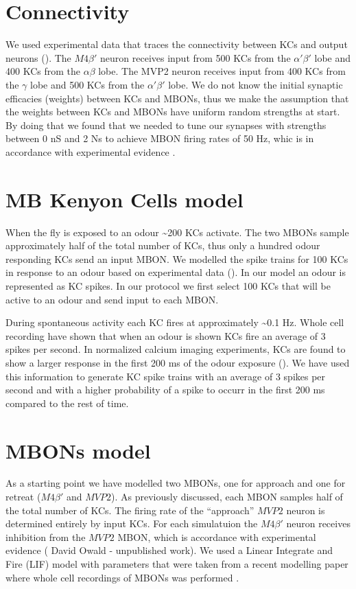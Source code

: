 \section{Connectivity}

We used experimental data that traces the connectivity between KCs
and output neurons (\citealp{Aso:2014bh}). The $M4\beta'$ neuron
receives input from 500 KCs from the $\alpha'\beta'$ lobe and 400
KCs from the $\alpha\beta$ lobe. The MVP2 neuron receives input from
400 KCs from the $\gamma$ lobe and 500 KCs from the $\alpha'\beta'$
lobe. We do not know the initial synaptic efficacies (weights) between
KCs and MBONs, thus we make the assumption that the weights between
KCs and MBONs have uniform random strengths at start. By doing that
we found that we needed to tune our synapses with strengths between
0 nS and 2 Ns to achieve MBON firing rates of 50 Hz, whic is in accordance
with experimental evidence \citep{Hige:2015er}.

\section{MB Kenyon Cells model}

When the fly is exposed to an odour \textasciitilde{}200 KCs activate.
The two MBONs sample approximately half of the total number of KCs,
thus only a hundred odour responding KCs send an input MBON. We modelled
the spike trains for 100 KCs in response to an odour based on experimental
data (\citealp{Turner:2008eo}). In our model an odour is represented
as KC spikes. In our protocol we first select 100 KCs that will be
active to an odour and send input to each MBON. 

During spontaneous activity each KC fires at approximately \textasciitilde{}0.1
Hz. Whole cell recording have shown that when an odour is shown KCs
fire an average of 3 spikes per second. In normalized calcium imaging
experiments, KCs are found to show a larger response in the first
200 ms of the odour exposure (\citealp{Turner:2008eo}). We have used
this information to generate KC spike trains with an average of 3
spikes per second and with a higher probability of a spike to occurr
in the first 200 ms compared to the rest of time.  


\section{MBONs model}

As a starting point we have modelled two MBONs, one for approach and
one for retreat ($M4\beta'$  and $MVP2$). As previously discussed,
each MBON samples half of the total number of KCs. The firing rate
of the ``approach'' $MVP2$ neuron is determined entirely by input
KCs. For each simulatuion the $M4\beta'$ neuron receives inhibition
from the $MVP2$ MBON, which is accordance with experimental evidence
( David Owald - unpublished work). We used a Linear Integrate and
Fire (LIF) model with parameters that were taken from a recent modelling
paper where whole cell recordings of MBONs was performed \citep{Hige:2015er}.

